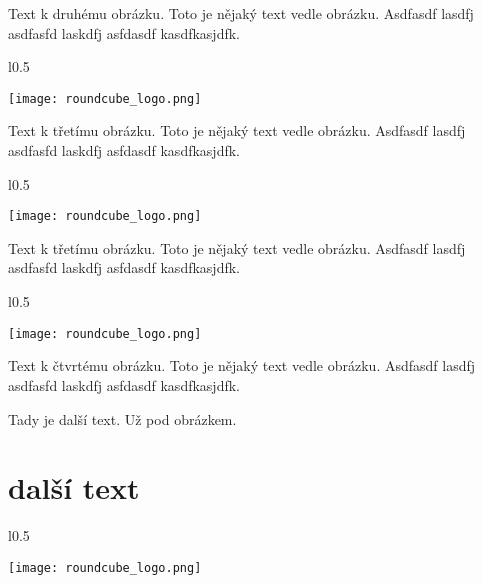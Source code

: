 \documentclass[12pt,a4paper,twoside]{book}
\begin{document}
Text k druhému obrázku. Toto je nějaký text vedle obrázku. Asdfasdf lasdfj asdfasfd laskdfj asfdasdf kasdfkasjdfk.
\newline

\begin{wrapfigure}{l}{0.5\textwidth}
  \vspace{-20pt}
  \begin{center}
    \texttt{[image: roundcube\_logo.png]}
  \end{center}
  \vspace{-20pt}
\end{wrapfigure}

Text k třetímu obrázku. Toto je nějaký text vedle obrázku. Asdfasdf lasdfj asdfasfd laskdfj asfdasdf kasdfkasjdfk.
\newline

\begin{wrapfigure}{l}{0.5\textwidth}
  \vspace{-20pt}
  \begin{center}
    \texttt{[image: roundcube\_logo.png]}
  \end{center}
  \vspace{-20pt}
\end{wrapfigure}
Text k třetímu obrázku. Toto je nějaký text vedle obrázku. Asdfasdf lasdfj asdfasfd laskdfj asfdasdf kasdfkasjdfk.
\newline

\begin{wrapfigure}{l}{0.5\textwidth}
  \vspace{-20pt}
  \begin{center}
    \texttt{[image: roundcube\_logo.png]}
  \end{center}
  \vspace{-20pt}
\end{wrapfigure}

Text k čtvrtému obrázku. Toto je nějaký text vedle obrázku. Asdfasdf lasdfj asdfasfd laskdfj asfdasdf kasdfkasjdfk.
\newline


Tady je další text. Už pod obrázkem.

\section{další  text}

\begin{wrapfigure}{l}{0.5\textwidth}
  \vspace{-30pt}
  \begin{center}
    \texttt{[image: roundcube\_logo.png]}
  \end{center}
  \vspace{-10pt}
\end{wrapfigure}
\end{document}

